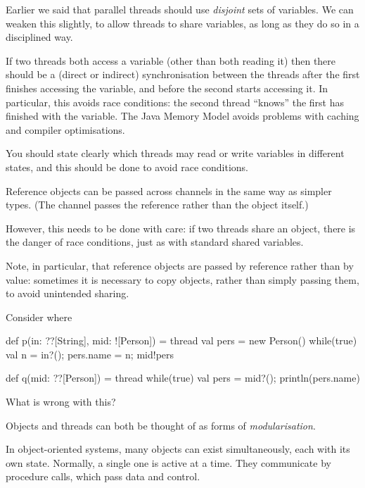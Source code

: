 

Earlier we said that parallel threads should use \emph{disjoint} sets of
variables.  We can weaken this slightly, to allow threads to share
variables, as long as they do so in a disciplined way. 

If two threads both access a variable (other than both reading it) then
there should be a (direct or indirect) synchronisation between the threads
after the first finishes accessing the variable, and before the second starts
accessing it.  In particular, this avoids race conditions: the second thread
``knows'' the first has finished with the variable.  The Java Memory Model
avoids problems with caching and compiler optimisations.

You should state clearly which threads may read or write variables in
different states, and this should be done to avoid race conditions.



Reference objects can be passed across channels in the same way as simpler
types.  (The channel passes the reference rather than the object itself.)

However, this needs to be done with care: if two threads share an object,
there is the danger of race conditions, just as with standard shared
variables. 
 
Note, in particular, that reference objects are passed by reference rather
than by value: sometimes it is necessary to copy objects, rather than simply
passing them, to avoid unintended sharing.

Consider  where
%
\begin{scala}
def p(in: ??[String], mid: ![Person]) = thread{
  val pers = new Person()
  while(true){ val n = in?(); pers.name = n; mid!pers }
}

def q(mid: ??[Person]) = thread{
  while(true){ val pers = mid?(); println(pers.name) }
} 
\end{scala}
%
What is wrong with this?



Objects and threads can both be thought of as forms of
\emph{modularisation}. 

In object-oriented systems, many objects can exist simultaneously, each with
its own state.  Normally, a single one is active at a time.  They communicate
by procedure calls, which pass data and control.

